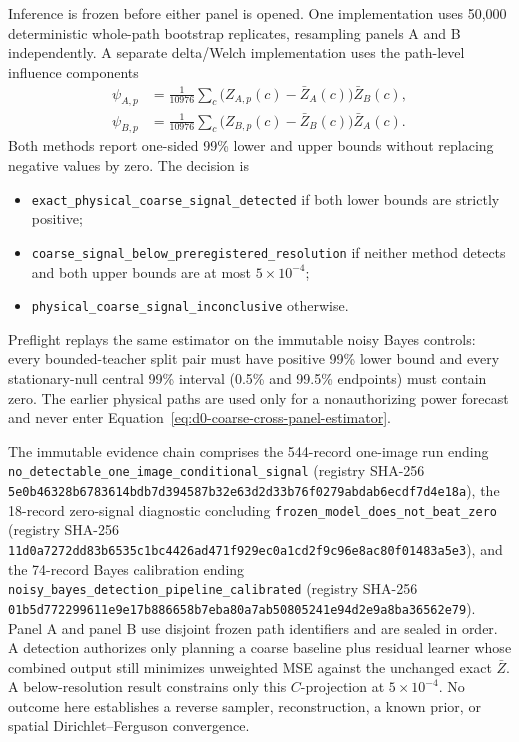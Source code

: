 \documentclass[11pt]{article}
\numberwithin{equation}{section}
\newcommand{\1}{\mathbf 1}
\begin{document}
Inference is frozen before either panel is opened.  One implementation uses
50,000 deterministic whole-path bootstrap replicates, resampling panels A
and B independently.  A separate delta/Welch implementation uses the
path-level influence components
\begin{align}
 \psi_{A,p}&=\frac1{10976}\sum_c
   \bigl(Z_{A,p}(c)-\bar Z_A(c)\bigr)\bar Z_B(c),\\
 \psi_{B,p}&=\frac1{10976}\sum_c
   \bigl(Z_{B,p}(c)-\bar Z_B(c)\bigr)\bar Z_A(c).
\end{align}
Both methods report one-sided 99\% lower and upper bounds without replacing
negative values by zero.  The decision is
\begin{itemize}[leftmargin=1.5em]
  \item \nolinkurl{exact_physical_coarse_signal_detected} if both lower
        bounds are strictly positive;
  \item \nolinkurl{coarse_signal_below_preregistered_resolution} if neither
        method detects and both upper bounds are at most \(5\times10^{-4}\);
  \item \nolinkurl{physical_coarse_signal_inconclusive} otherwise.
\end{itemize}
Preflight replays the same estimator on the immutable noisy Bayes controls:
every bounded-teacher split pair must have positive 99\% lower bound and
every stationary-null central 99\% interval (0.5\% and 99.5\% endpoints)
must contain zero.  The earlier physical
paths are used only for a nonauthorizing power forecast and never enter
Equation~\eqref{eq:d0-coarse-cross-panel-estimator}.

The immutable evidence chain comprises the 544-record one-image run ending
\nolinkurl{no_detectable_one_image_conditional_signal} (registry SHA-256
\nolinkurl{5e0b46328b6783614bdb7d394587b32e63d2d33b76f0279abdab6ecdf7d4e18a}),
the 18-record
zero-signal diagnostic concluding
\nolinkurl{frozen_model_does_not_beat_zero} (registry SHA-256
\nolinkurl{11d0a7272dd83b6535c1bc4426ad471f929ec0a1cd2f9c96e8ac80f01483a5e3}),
and the 74-record Bayes
calibration ending
\nolinkurl{noisy_bayes_detection_pipeline_calibrated} (registry SHA-256
\nolinkurl{01b5d772299611e9e17b886658b7eba80a7ab50805241e94d2e9a8ba36562e79}).
Panel A and panel B
use disjoint frozen path identifiers and are sealed in order.  A detection
authorizes only planning a coarse baseline plus residual learner whose
combined output still minimizes unweighted MSE against the unchanged exact
\(\bar Z\).  A below-resolution result constrains only this \(C\)-projection
at \(5\times10^{-4}\).  No outcome here establishes a reverse sampler,
reconstruction, a known prior, or spatial Dirichlet--Ferguson convergence.
\end{document}
